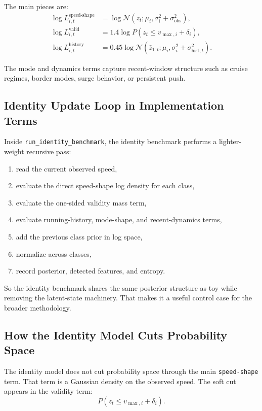 \documentclass[11pt]{article}
\begin{document}
The main pieces are:
\begin{align}
    \log L^{\text{speed-shape}}_{i,t}
    &= \log \mathcal{N}\!\left(z_t; \mu_i, \sigma_i^2 + \sigma_{\text{obs}}^2\right), \\
    \log L^{\text{valid}}_{i,t}
    &= 1.4 \log P\!\left(z_t \leq v_{\max,i} + \delta_i\right), \\
    \log L^{\text{history}}_{i,t}
    &= 0.45 \log \mathcal{N}\!\left(\bar{z}_{1:t}; \mu_i, \sigma_i^2 + \sigma_{\text{hist},t}^2\right).
\end{align}

The mode and dynamics terms capture recent-window structure such as cruise
regimes, border modes, surge behavior, or persistent push.

\subsection{Identity Update Loop in Implementation Terms}

Inside \texttt{run\_identity\_benchmark}, the identity benchmark performs a
lighter-weight recursive pass:
\begin{enumerate}[leftmargin=1.8em]
    \item read the current observed speed,
    \item evaluate the direct speed-shape log density for each class,
    \item evaluate the one-sided validity mass term,
    \item evaluate running-history, mode-shape, and recent-dynamics terms,
    \item add the previous class prior in log space,
    \item normalize across classes,
    \item record posterior, detected features, and entropy.
\end{enumerate}

So the identity benchmark shares the same posterior structure as toy while
removing the latent-state machinery. That makes it a useful control case for
the broader methodology.

\subsection{How the Identity Model Cuts Probability Space}

The identity model does not cut probability space through the main
\texttt{speed-shape} term. That term is a Gaussian density on the observed
speed. The soft cut appears in the validity term:
\begin{equation}
    P(z_t \leq v_{\max,i} + \delta_i).
\end{equation}
\end{document}
